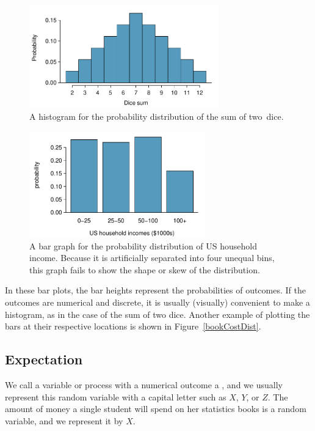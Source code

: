 \begin{figure}
\centering
\includegraphics[width=0.73\textwidth]{ch_probability/figures/diceSumDist/diceSumDist}
\caption{A histogram for the probability distribution of the sum of two~dice.}
\label{diceSumDist}
\end{figure}

\begin{figure}
\centering
\includegraphics[width=0.68\textwidth]{ch_probability/figures/usHouseholdIncomeDistBar/usHouseholdIncomeDistBar}
\caption{A bar graph for the probability distribution of US household income. Because it is artificially separated into four unequal bins, this graph fails to show the shape or skew of the distribution.}
\label{usHouseholdIncomeDistBar}
\end{figure}

In these bar plots, the bar heights represent the probabilities of outcomes. If the outcomes are numerical and discrete, it is usually (visually) convenient to make a histogram, as in the case of the sum of two dice. Another example of plotting the bars at their respective locations is shown in Figure~\ref{bookCostDist}.


\subsection{Expectation}


We call a variable or process with a numerical outcome a , and we usually represent this random variable with a capital letter such as $X$, $Y$, or $Z$. The amount of money a single student will spend on her statistics books is a random variable, and we represent it by $X$.


